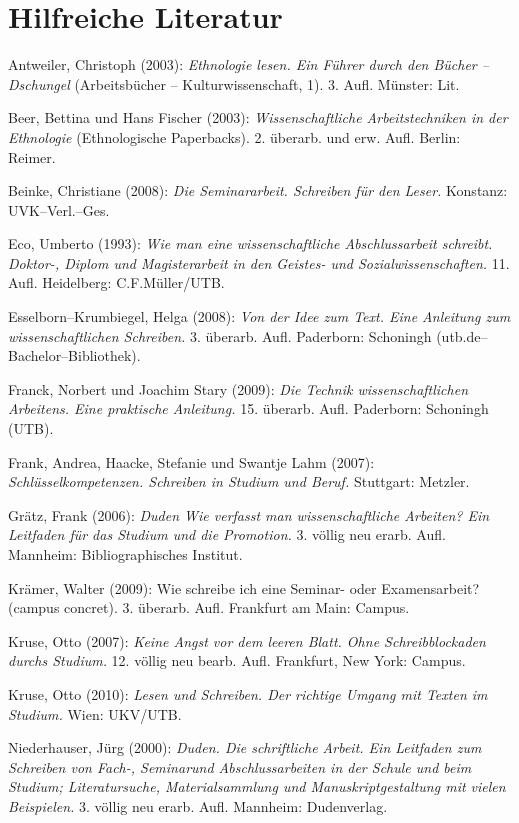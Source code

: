 \documentclass[ 12pt,
                titlepage,
                parskip=half,
                version=first,
                bibliography=totocnumbered,
                final,
                listof=totoc]{scrartcl}
\begin{document}
\newpage
\section{Hilfreiche Literatur}

Antweiler, Christoph (2003): \emph{Ethnologie lesen. Ein Führer durch den Bücher
--Dschungel} (Arbeitsbücher -- Kulturwissenschaft, 1). 3. Aufl. Münster: Lit.

Beer, Bettina und Hans Fischer (2003): \emph{Wissenschaftliche Arbeitstechniken
in der Ethnologie} (Ethnologische Paperbacks). 2. überarb. und erw. Aufl.
Berlin: Reimer.

Beinke, Christiane (2008): \emph{Die Seminararbeit. Schreiben für den Leser.}
Konstanz: UVK--Verl.--Ges.

Eco, Umberto (1993): \emph{Wie man eine wissenschaftliche Abschlussarbeit
schreibt. Doktor-, Diplom und Magisterarbeit in den Geistes- und
Sozialwissenschaften.} 11. Aufl. Heidelberg: C.F.Müller/UTB.

Esselborn--Krumbiegel, Helga (2008): \emph{Von der Idee zum Text. Eine Anleitung
zum wissenschaftlichen Schreiben.} 3. überarb. Aufl. Paderborn: Schoningh
(utb.de--Bachelor--Bibliothek).

Franck, Norbert und Joachim Stary (2009): \emph{Die Technik wissenschaftlichen
Arbeitens. Eine praktische Anleitung.} 15. überarb. Aufl. Paderborn: Schoningh
(UTB).

Frank, Andrea, Haacke, Stefanie und Swantje Lahm (2007):
\emph{Schlüsselkompetenzen. Schreiben in Studium und Beruf.} Stuttgart: Metzler.

Grätz, Frank (2006): \emph{Duden Wie verfasst man wissenschaftliche Arbeiten?
Ein Leitfaden für das Studium und die Promotion.} 3. völlig neu erarb. Aufl.
Mannheim: Bibliographisches Institut.

Krämer, Walter (2009): Wie schreibe ich eine Seminar- oder Examensarbeit?
(campus concret). 3. überarb. Aufl. Frankfurt am Main: Campus.

Kruse, Otto (2007): \emph{Keine Angst vor dem leeren Blatt. Ohne
Schreibblockaden durchs Studium.} 12. völlig neu bearb. Aufl. Frankfurt, New
York: Campus.

Kruse, Otto (2010): \emph{Lesen und Schreiben. Der richtige Umgang mit Texten im
Studium.} Wien: UKV/UTB.

Niederhauser, Jürg (2000): \emph{Duden. Die schriftliche Arbeit. Ein Leitfaden
zum Schreiben von Fach-, Seminarund Abschlussarbeiten in der Schule und beim
Studium; Literatursuche, Materialsammlung und Manuskriptgestaltung mit vielen
Beispielen.} 3. völlig neu erarb. Aufl. Mannheim: Dudenverlag.
\end{document}
